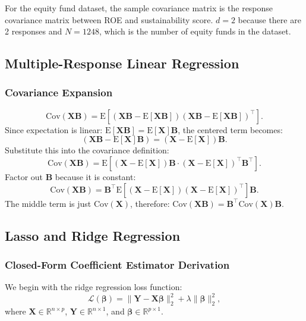 \documentclass[11pt]{report} %
\begin{document}
For the equity fund dataset, the sample covariance matrix is the response covariance matrix between ROE and sustainability score. $d=2$ because there are 2 responses and $N=1248$, which is the number of equity funds in the dataset.


\subsection{Multiple-Response Linear Regression}
\subsubsection{Covariance Expansion}
\label{Covariance Expansion}
\[
\text{Cov}(\mathbf{X} \mathbf{B}) = \text{E}[(\mathbf{X} \mathbf{B} - \text{E}[\mathbf{X} \mathbf{B}]) (\mathbf{X} \mathbf{B} - \text{E}[\mathbf{X} \mathbf{B}])^\top].
\]
Since expectation is linear: $\text{E}[\mathbf{X} \mathbf{B}] = \text{E}[\mathbf{X}] \mathbf{B}$, the centered term becomes: 
\[
(\mathbf{X} \mathbf{B} - \text{E}[\mathbf{X}] \mathbf{B}) = (\mathbf{X} - \text{E}[\mathbf{X}]) \mathbf{B}.
\]
Substitute this into the covariance definition:
\[
\text{Cov}(\mathbf{X} \mathbf{B}) = \text{E} \left[ (\mathbf{X} - \text{E}[\mathbf{X}]) \mathbf{B} \cdot (\mathbf{X} - \text{E}[\mathbf{X}])^\top \mathbf{B}^\top \right].
\]
Factor out \( \mathbf{B} \) because it is constant:
\[
\text{Cov}(\mathbf{X} \mathbf{B})=\mathbf{B}^\top \text{E} \left[ (\mathbf{X} - \text{E}[\mathbf{X}]) (\mathbf{X} - \text{E}[\mathbf{X}])^\top \right] \mathbf{B}.
\]
The middle term is just \( \text{Cov}(\mathbf{X}) \), therefore:
$
\text{Cov}(\mathbf{X} \mathbf{B}) = \mathbf{B}^\top \text{Cov}(\mathbf{X}) \mathbf{B}.
$

\subsection{Lasso and Ridge Regression}
\subsubsection{Closed-Form Coefficient Estimator Derivation}
\label{ridge-appendix}
We begin with the ridge regression loss function:
\begin{equation*}
\mathcal{L}(\boldsymbol{\beta}) = \| \mathbf{Y} - \mathbf{X} \boldsymbol{\beta} \|_2^2 + \lambda \| \boldsymbol{\beta} \|_2^2,
\end{equation*}
where \(\mathbf{X} \in \mathbb{R}^{n \times p}\), \(\mathbf{Y} \in \mathbb{R}^{n \times 1}\), and \(\boldsymbol{\beta} \in \mathbb{R}^{p \times 1}\).
\end{document}
